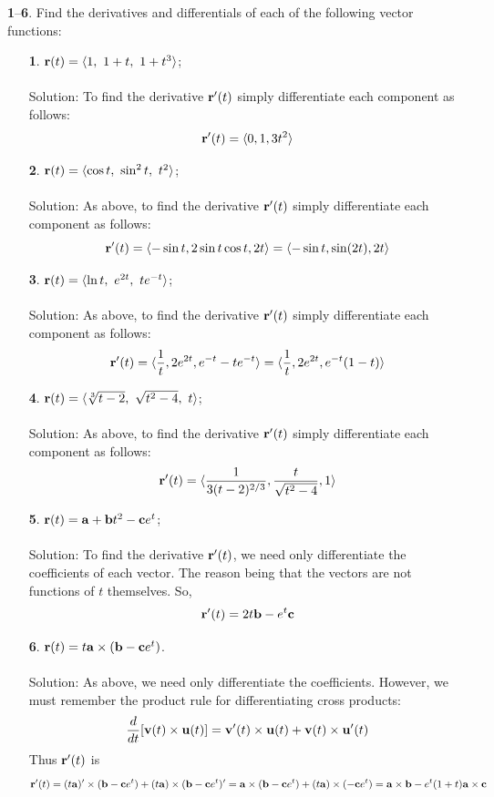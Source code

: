 \documentclass[12pt]{amsbook}
\newcommand{\la}{\langle}
\newcommand{\ra}{\rangle}
\begin{document}
\noindent
{\small {\bf 1}--{\bf 6}}. Find the derivatives and differentials of each of the following vector
functions:
\begin{enumerate}
  \item[{\small\bf 1}.] ${\bf r}(t)=\la 1, \ 1+t, \ 1+t^3 \ra$;
  \\
  \\
  {\sc Solution}: To find the derivative ${\bf r}'(t)$ simply differentiate each component as follows:
  $${\bf r}'(t)=\la 0,1,3t^2 \ra$$
  \item[{\small\bf 2}.] ${\bf r}(t)=\la \cos t, \ \sin^2 t, \ t^2\ra$;
  \\
  \\
  {\sc Solution}: As above, to find the derivative ${\bf r}'(t)$ simply differentiate each component as follows:
  $${\bf r}'(t)=\la -\sin t,2\sin t\cos t,2t \ra=\la -\sin t,\sin (2t),2t \ra$$
  \item[{\small\bf 3}.] ${\bf r}(t)=\la \ln t, \ e^{2t}, \ te^{-t}\ra$;
  \\
  \\
  {\sc Solution}: As above, to find the derivative ${\bf r}'(t)$ simply differentiate each component as follows:
  $${\bf r}'(t)=\la \frac{1}{t},2e^{2t},e^{-t}-te^{-t} \ra=\la \frac{1}{t},2e^{2t},e^{-t}(1-t) \ra$$
  \item[{\small\bf 4}.] ${\bf r}(t)=\la \sqrt[3]{t-2}, \ \sqrt{t^2-4}, \ t\ra$;
  \\
  \\
  {\sc Solution}: As above, to find the derivative ${\bf r}'(t)$ simply differentiate each component as follows:
  $${\bf r}'(t)=\la \frac{1}{3(t-2)^{2/3}},\frac{t}{\sqrt{t^2-4}},1 \ra$$
  \item[{\small\bf 5}.] ${\bf r}(t)={\bf a}+{\bf b}t^2-{\bf c}e^t$;
  \\
  \\
  {\sc Solution}: To find the derivative ${\bf r}'(t)$, we need only differentiate the coefficients of each vector. The reason being that the vectors are not functions of $t$ themselves. So,
  $${\bf r}'(t)=2t{\bf b}-e^t{\bf c}$$
  \item[{\small\bf 6}.] ${\bf r}(t)=t{\bf a}\times({\bf b}-{\bf c}e^t)$.
  \\
  \\
  {\sc Solution}: As above, we need only differentiate the coefficients. However, we must remember the product rule for differentiating cross products:
  $$\frac{d}{dt}[{\bf v}(t)\times{\bf u}(t)]={\bf v}'(t)\times{\bf u}(t)+{\bf v}(t)\times{\bf u}'(t)$$
  Thus ${\bf r}'(t)$ is
  $${\bf r}'(t)=(t{\bf a})'\times({\bf b}-{\bf c}e^t)+(t{\bf a})\times({\bf b}-{\bf c}e^t)'={\bf a}\times({\bf b}-{\bf c}e^t)+(t{\bf a})\times(-{\bf c}e^t)={\bf a}\times{\bf b}-e^t(1+t){\bf a}\times{\bf c}$$
\end{enumerate}
\end{document}
